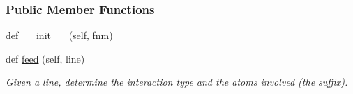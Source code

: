 \subsubsection*{Public Member Functions}
\begin{DoxyCompactItemize}
\item 
def \hyperlink{classsrc_1_1gmxio_1_1ITP__Reader_a5c347e28bb395ac06f1471ad3bf1bda9}{\+\_\+\+\_\+init\+\_\+\+\_\+} (self, fnm)
\item 
def \hyperlink{classsrc_1_1gmxio_1_1ITP__Reader_ad77cbfb59fb27a9dc29aef06b0ef9d85}{feed} (self, line)
\begin{DoxyCompactList}\small\item\em Given a line, determine the interaction type and the atoms involved (the suffix). \end{DoxyCompactList}\end{DoxyCompactItemize}
